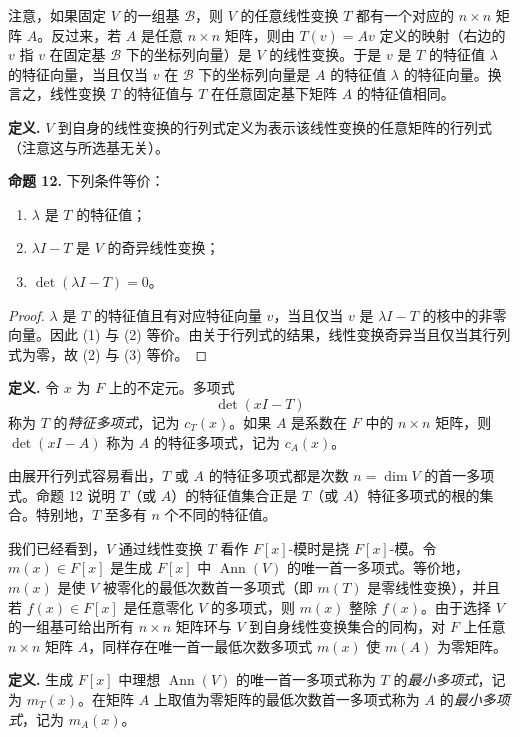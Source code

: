 注意，如果固定 $V$ 的一组基 $\mathcal B$，则 $V$ 的任意线性变换 $T$ 都有一个对应的 $n\times n$ 矩阵 $A$。反过来，若 $A$ 是任意 $n\times n$ 矩阵，则由 $T(v)=Av$ 定义的映射（右边的 $v$ 指 $v$ 在固定基 $\mathcal B$ 下的坐标列向量）是 $V$ 的线性变换。于是 $v$ 是 $T$ 的特征值 $\lambda$ 的特征向量，当且仅当 $v$ 在 $\mathcal B$ 下的坐标列向量是 $A$ 的特征值 $\lambda$ 的特征向量。换言之，线性变换 $T$ 的特征值与 $T$ 在任意固定基下矩阵 $A$ 的特征值相同。

\noindent\textbf{定义.} $V$ 到自身的线性变换的行列式定义为表示该线性变换的任意矩阵的行列式（注意这与所选基无关）。

\noindent\textbf{命题 12.} 下列条件等价：
\begin{enumerate}[label=(\arabic*)]
\item $\lambda$ 是 $T$ 的特征值；
\item $\lambda I-T$ 是 $V$ 的奇异线性变换；
\item $\det(\lambda I-T)=0$。
\end{enumerate}

\begin{proof}
$\lambda$ 是 $T$ 的特征值且有对应特征向量 $v$，当且仅当 $v$ 是 $\lambda I-T$ 的核中的非零向量。因此 (1) 与 (2) 等价。由关于行列式的结果，线性变换奇异当且仅当其行列式为零，故 (2) 与 (3) 等价。
\end{proof}

\noindent\textbf{定义.} 令 $x$ 为 $F$ 上的不定元。多项式
\[
\det(xI-T)
\]
称为 $T$ 的\emph{特征多项式}，记为 $c_T(x)$。如果 $A$ 是系数在 $F$ 中的 $n\times n$ 矩阵，则 $\det(xI-A)$ 称为 $A$ 的特征多项式，记为 $c_A(x)$。

由展开行列式容易看出，$T$ 或 $A$ 的特征多项式都是次数 $n=\dim V$ 的首一多项式。命题 12 说明 $T$（或 $A$）的特征值集合正是 $T$（或 $A$）特征多项式的根的集合。特别地，$T$ 至多有 $n$ 个不同的特征值。

我们已经看到，$V$ 通过线性变换 $T$ 看作 $F[x]$-模时是挠 $F[x]$-模。令 $m(x)\in F[x]$ 是生成 $F[x]$ 中 $\operatorname{Ann}(V)$ 的唯一首一多项式。等价地，$m(x)$ 是使 $V$ 被零化的最低次数首一多项式（即 $m(T)$ 是零线性变换），并且若 $f(x)\in F[x]$ 是任意零化 $V$ 的多项式，则 $m(x)$ 整除 $f(x)$。由于选择 $V$ 的一组基可给出所有 $n\times n$ 矩阵环与 $V$ 到自身线性变换集合的同构，对 $F$ 上任意 $n\times n$ 矩阵 $A$，同样存在唯一首一最低次数多项式 $m(x)$ 使 $m(A)$ 为零矩阵。

\noindent\textbf{定义.} 生成 $F[x]$ 中理想 $\operatorname{Ann}(V)$ 的唯一首一多项式称为 $T$ 的\emph{最小多项式}，记为 $m_T(x)$。在矩阵 $A$ 上取值为零矩阵的最低次数首一多项式称为 $A$ 的\emph{最小多项式}，记为 $m_A(x)$。

